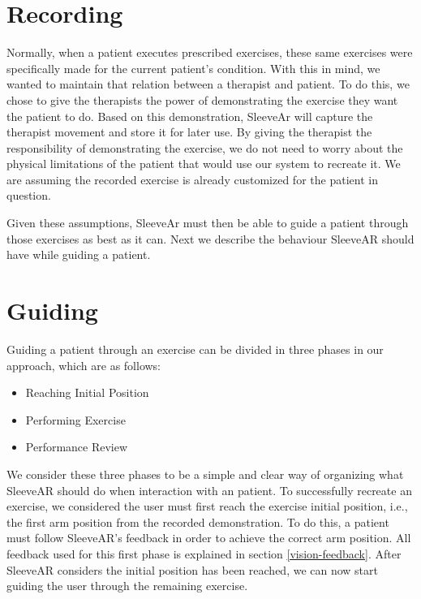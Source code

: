 
\section{Recording}

Normally, when a patient executes prescribed exercises, these same exercises were specifically made for the current patient's condition. 
With this in mind, we wanted to maintain that relation between a therapist and patient. 
To do this, we chose to give the therapists the power of demonstrating the exercise they want the patient to do. 
Based on this demonstration, SleeveAr will capture the therapist movement and store it for later use.
By giving the therapist the responsibility of demonstrating the exercise, we do not need to worry about the physical limitations of the patient that would use our system to recreate it. 
We are assuming the recorded exercise is already customized for the patient in question.

Given these assumptions, SleeveAr must then be able to guide a patient through those exercises as best as it can. Next we describe the behaviour SleeveAR should have while guiding a patient.


\section{Guiding}

Guiding a patient through an exercise can be divided in three phases in our approach, which are as follows:

\begin{itemize}
\item Reaching Initial Position
\item Performing Exercise
\item Performance Review
\end{itemize}

We consider these three phases to be a simple and clear way of organizing what SleeveAR should do when interaction with an patient.
To successfully recreate an exercise, we considered the user must first reach the exercise initial position, i.e., the first arm position from the recorded demonstration.
To do this, a patient must follow SleeveAR's feedback in order to achieve the correct arm position. 
All feedback used for this first phase is explained in section \ref{vision-feedback}.
After SleeveAR considers the initial position has been reached, we can now start guiding the user through the remaining exercise.

